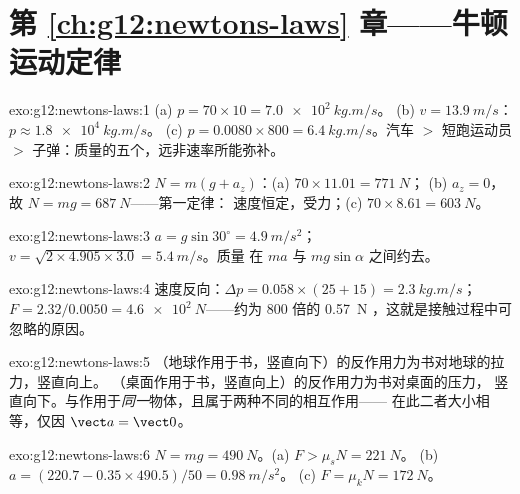 \section*{第 \ref{ch:g12:newtons-laws} 章——牛顿运动定律}

\begin{solution}{exo:g12:newtons-laws:1}
(a) $p = 70 \times 10 = \qty{7.0e2}{kg.m/s}$。
(b) $v = \qty{13.9}{m/s}$：$p \approx \qty{1.8e4}{kg.m/s}$。
(c) $p = 0.0080 \times 800 = \qty{6.4}{kg.m/s}$。汽车 $>$ 短跑运动员 $>$
子弹：质量的五个，远非速率所能弥补。
\end{solution}

\begin{solution}{exo:g12:newtons-laws:2}
$N = m(g + a_z)$：(a) $70 \times 11.01 = \qty{771}{N}$；
(b) $a_z = 0$，故 $N = mg = \qty{687}{N}$——第一定律：
速度恒定，受力；(c) $70 \times 8.61 = \qty{603}{N}$。
\end{solution}

\begin{solution}{exo:g12:newtons-laws:3}
$a = g\sin 30^\circ = \qty{4.9}{m/s^2}$；
$v = \sqrt{2 \times 4.905 \times 3.0} = \qty{5.4}{m/s}$。质量
在 $ma$ 与 $mg\sin\alpha$ 之间约去。
\end{solution}

\begin{solution}{exo:g12:newtons-laws:4}
速度反向：$\Delta p = 0.058 \times (25 + 15) = \qty{2.3}{kg.m/s}$；
$F = 2.32/0.0050 = \qty{4.6e2}{N}$——约为 $800$ 倍的
\qty{0.57}{N} ，这就是接触过程中可忽略的原因。
\end{solution}

\begin{solution}{exo:g12:newtons-laws:5}
（地球作用于书，竖直向下）的反作用力为书对地球的拉力，竖直向上。
（桌面作用于书，竖直向上）的反作用力为书对桌面的压力，
竖直向下。与作用于\emph{同一}物体，且属于两种不同的相互作用——
在此二者大小相等，仅因 $\vect a = \vect 0$。
\end{solution}

\begin{solution}{exo:g12:newtons-laws:6}
$N = mg = \qty{490}{N}$。(a) $F > \mu_s N = \qty{221}{N}$。
(b) $a = (220.7 - 0.35 \times 490.5)/50 = \qty{0.98}{m/s^2}$。
(c) $F = \mu_k N = \qty{172}{N}$。
\end{solution}

